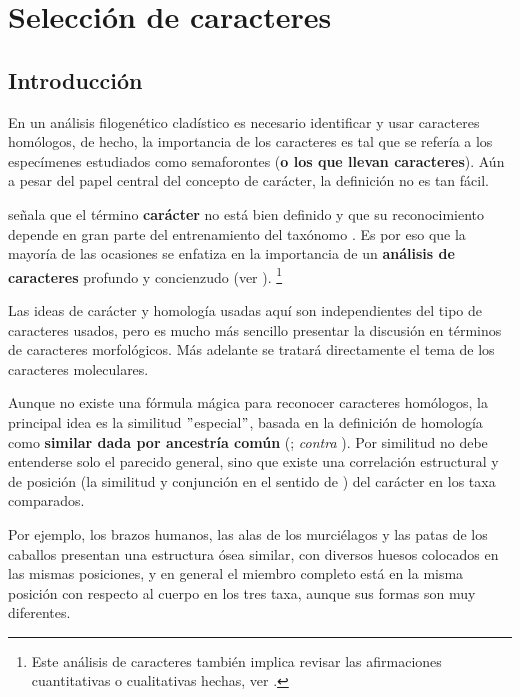 \chapter{Selecci\'on de caracteres}
\section*{Introducci\'on}

En un an\'alisis filogen\'etico clad\'istico es necesario 
identificar y usar caracteres hom\'ologos, de hecho, la importancia 
de los caracteres es tal que \cite{Hennig1968} se refer\'ia a los 
espec\'imenes estudiados como semaforontes (\textbf{o los que 
llevan caracteres}). A\'un a pesar del papel central del concepto de 
car\'acter, la definici\'on no es tan f\'acil.


\cite{Richards2003}  se\~nala que el t\'ermino \textbf{car\'acter} no 
est\'a bien definido y que su reconocimiento depende  en gran parte del 
entrenamiento del tax\'onomo \citep{Richards2002}. Es por eso que la 
mayor\'ia de las ocasiones se enfatiza en la importancia de un 
\textbf{an\'alisis de caracteres} profundo y concienzudo (ver 
\cite{Hennig1968,Neff1986,RK2001}). \footnote{Este an\'alisis de 
caracteres tambi\'en implica revisar las afirmaciones cuantitativas o 
cualitativas hechas, ver \cite{wiens2001}.}


Las ideas de car\'acter y homolog\'ia usadas aqu\'i son independientes 
del tipo de caracteres usados, pero es mucho m\'as sencillo presentar 
la discusi\'on en t\'erminos de caracteres morfol\'ogicos. M\'as 
adelante se tratar\'a directamente el tema de los caracteres 
moleculares. 

Aunque no existe una f\'ormula m\'agica para reconocer caracteres 
hom\'ologos, la principal idea es la similitud $"$especial$"$, basada 
en la definici\'on de homolog\'ia como \textbf{similar dada por 
ancestr\'ia com\'un} (\citep{RK2001}; \textit{contra} 
\cite{kluge2003,Grant2004}). Por similitud no debe entenderse solo el 
parecido general, sino que existe una correlaci\'on estructural y de 
posici\'on (la similitud y conjunci\'on en el sentido de  
\cite{Patterson1981}) del car\'acter en los taxa comparados. 

Por ejemplo, los brazos humanos, las alas de los murci\'elagos y las 
patas de los caballos presentan una estructura \'osea similar, con 
diversos huesos colocados en las mismas posiciones, y en general el 
miembro completo est\'a en la misma posici\'on con respecto al cuerpo 
en los tres taxa, aunque sus formas son muy diferentes.


